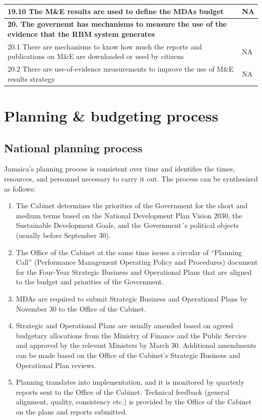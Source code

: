 \documentclass[
  10pt,
]{book}
\begin{document}
\begin{table}
\begin{tabular}[t]{l|l}
\hspace{1em}19.10 The M\&E results are used to define the MDAs budget & NA\\
\hline
\multicolumn{2}{l}{\textbf{20. The governemt has mechanisms to measure the use of the evidence that the RBM system generates}}\\
\hline
\hspace{1em}20.1 There are mechanisms to know how much the reports and publications on M\&E are downloaded or used by citizens & NA\\
\hline
\hspace{1em}20.2 There are use-of-evidence measurements to improve the use of M\&E results strategy & NA\\
\hline
\end{tabular}
\end{table}

\hypertarget{appendixC}{%
\chapter{Planning \& budgeting process}\label{appendixC}}

\hypertarget{national-planning-process-1}{%
\section{National planning process}\label{national-planning-process-1}}

Jamaica's planning process is consistent over time and identifies the times, resources, and personnel necessary to carry it out. The process can be synthesized as follows:

\begin{enumerate}
\def\labelenumi{\arabic{enumi}.}
\item
  The Cabinet determines the priorities of the Government for the short and medium terms based on the National Development Plan Vision 2030, the Sustainable Development Goals, and the Government´s political objects (usually before September 30).
\item
  The Office of the Cabinet at the same time issues a circular of ``Planning Call'' (Performance Management Operating Policy and Procedures) document for the Four-Year Strategic Business and Operational Plans that are aligned to the budget and priorities of the Government.
\item
  MDAs are required to submit Strategic Business and Operational Plans by November 30 to the Office of the Cabinet.
\item
  Strategic and Operational Plans are usually amended based on agreed budgetary allocations from the Ministry of Finance and the Public Service and approved by the relevant Ministers by March 30. Additional amendments can be made based on the Office of the Cabinet's Strategic Business and Operational Plan reviews.
\item
  Planning translates into implementation, and it is monitored by quarterly reports sent to the Office of the Cabinet. Technical feedback (general alignment, quality, consistency etc.) is provided by the Office of the Cabinet on the plans and reports submitted.
\end{enumerate}
\end{document}
